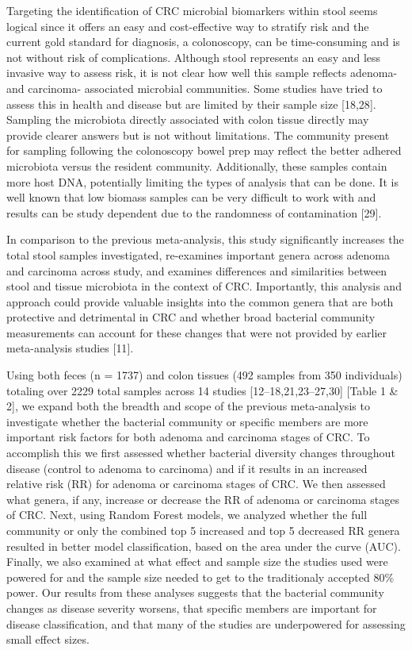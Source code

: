 \documentclass[12pt,]{article}
\begin{document}
Targeting the identification of CRC microbial biomarkers within stool
seems logical since it offers an easy and cost-effective way to stratify
risk and the current gold standard for diagnosis, a colonoscopy, can be
time-consuming and is not without risk of complications. Although stool
represents an easy and less invasive way to assess risk, it is not clear
how well this sample reflects adenoma- and carcinoma- associated
microbial communities. Some studies have tried to assess this in health
and disease but are limited by their sample size {[}18,28{]}. Sampling
the microbiota directly associated with colon tissue directly may
provide clearer answers but is not without limitations. The community
present for sampling following the colonoscopy bowel prep may reflect
the better adhered microbiota versus the resident community.
Additionally, these samples contain more host DNA, potentially limiting
the types of analysis that can be done. It is well known that low
biomass samples can be very difficult to work with and results can be
study dependent due to the randomness of contamination {[}29{]}.

In comparison to the previous meta-analysis, this study significantly
increases the total stool samples investigated, re-examines important
genera across adenoma and carcinoma across study, and examines
differences and similarities between stool and tissue microbiota in the
context of CRC. Importantly, this analysis and approach could provide
valuable insights into the common genera that are both protective and
detrimental in CRC and whether broad bacterial community measurements
can account for these changes that were not provided by earlier
meta-analysis studies {[}11{]}.

Using both feces (n = 1737) and colon tissues (492 samples from 350
individuals) totaling over 2229 total samples across 14 studies
{[}12--18,21,23--27,30{]} {[}Table 1 \& 2{]}, we expand both the breadth
and scope of the previous meta-analysis to investigate whether the
bacterial community or specific members are more important risk factors
for both adenoma and carcinoma stages of CRC. To accomplish this we
first assessed whether bacterial diversity changes throughout disease
(control to adenoma to carcinoma) and if it results in an increased
relative risk (RR) for adenoma or carcinoma stages of CRC. We then
assessed what genera, if any, increase or decrease the RR of adenoma or
carcinoma stages of CRC. Next, using Random Forest models, we analyzed
whether the full community or only the combined top 5 increased and top
5 decreased RR genera resulted in better model classification, based on
the area under the curve (AUC). Finally, we also examined at what effect
and sample size the studies used were powered for and the sample size
needed to get to the traditionaly accepted 80\% power. Our results from
these analyses suggests that the bacterial community changes as disease
severity worsens, that specific members are important for disease
classification, and that many of the studies are underpowered for
assessing small effect sizes.
\end{document}
